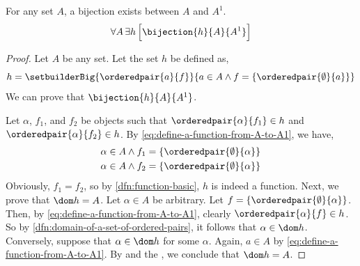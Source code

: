 \begin{thm}
    \label{thm:a-bijection-exists-between-A-and-A1}
    For any set \( A \), a bijection exists between \( A \) and \( A^{1} \).
    \begin{equation*}
        \forall A \, \exists h \, \Big[ \bijection{h}{A}{A^{1}} \Big]
    \end{equation*}
\end{thm}

\begin{proof}
    Let \( A \) be any set. Let the set \( h \) be defined as,
    \begin{equation}
        \label{eq:define-a-function-from-A-to-A1}
        h = \setbuilderBig{\orderedpair{a}{f}}{a \in A \land f = \mleft\{ \orderedpair{\emptyset}{a} \mright\}}
    \end{equation}
    We can prove that \( \bijection{h}{A}{A^{1}} \).

    \vspace{0.2cm}
    \noindent
    Let \( \alpha \), \( f_{1} \), and \( f_{2} \) be objects such that \( \orderedpair{\alpha}{f_{1}} \in h \)
    and \( \orderedpair{\alpha}{f_{2}} \in h \). By \eqref{eq:define-a-function-from-A-to-A1}, we have,
    \begin{gather*}
        \alpha \in A \land f_{1} = \mleft\{ \orderedpair{\emptyset}{\alpha} \mright\}\\
        \alpha \in A \land f_{2} = \mleft\{ \orderedpair{\emptyset}{\alpha} \mright\}
    \end{gather*}
    Obviously, \( f_{1} = f_{2} \), so by \cref{dfn:function-basic}, \( h \) is indeed a function. Next, we
    prove that \( \dom h = A \).
    Let \( \alpha \in A \) be arbitrary. Let \( f = \mleft\{ \orderedpair{\emptyset}{\alpha} \mright\} \).
    Then, by \eqref{eq:define-a-function-from-A-to-A1}, clearly \( \orderedpair{\alpha}{f} \in h \). So by
    \cref{dfn:domain-of-a-set-of-ordered-pairs}, it follows that \( \alpha \in \dom h \). Conversely,
    suppose that \( \alpha \in \dom h \) for some \( \alpha \). Again, \( a \in A \) by \eqref{eq:define-a-function-from-A-to-A1}.
    By  and the , we conclude that \( \dom h = A \).


\end{proof}
